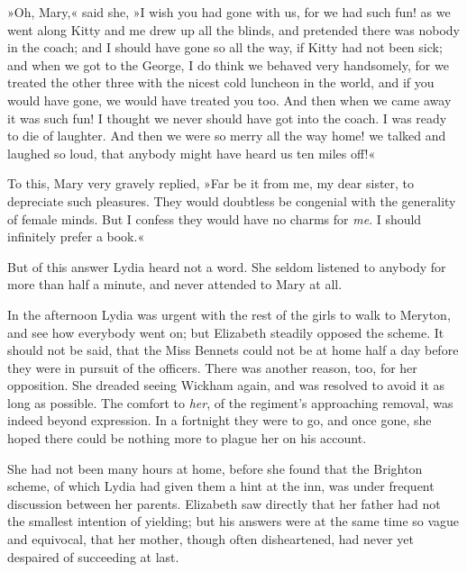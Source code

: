 »Oh, Mary,« said she, »I wish you had gone with us, for we had such fun! as we went along Kitty and me drew up all the blinds, and pretended there was nobody in the coach; and I should have gone so all the way, if Kitty had not been sick; and when we got to the George, I do think we behaved very handsomely, for we treated the other three with the nicest cold luncheon in the world, and if you would have gone, we would have treated you too. And then when we came away it was such fun! I thought we never should have got into the coach. I was ready to die of laughter. And then we were so merry all the way home! we talked and laughed so loud, that anybody might have heard us ten miles off!«

To this, Mary very gravely replied, »Far be it from me, my dear sister, to depreciate such pleasures. They would doubtless be congenial with the generality of female minds. But I confess they would have no charms for \textit{me}. I should infinitely prefer a book.«

But of this answer Lydia heard not a word. She seldom listened to anybody for more than half a minute, and never attended to Mary at all.

In the afternoon Lydia was urgent with the rest of the girls to walk to Meryton, and see how everybody went on; but Elizabeth steadily opposed the scheme. It should not be said, that the Miss Bennets could not be at home half a day before they were in pursuit of the officers. There was another reason, too, for her opposition. She dreaded seeing Wickham again, and was resolved to avoid it as long as possible. The comfort to \textit{her}, of the regiment's approaching removal, was indeed beyond expression. In a fortnight they were to go, and once gone, she hoped there could be nothing more to plague her on his account.

She had not been many hours at home, before she found that the Brighton scheme, of which Lydia had given them a hint at the inn, was under frequent discussion between her parents. Elizabeth saw directly that her father had not the smallest intention of yielding; but his answers were at the same time so vague and equivocal, that her mother, though often disheartened, had never yet despaired of succeeding at last.
